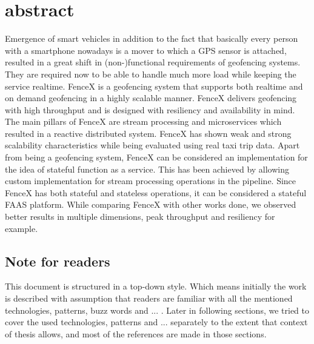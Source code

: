 \documentclass[a4]{report}
\begin{document}
        \section{abstract}
        Emergence of smart vehicles in addition to the fact that basically every person with a smartphone nowadays is a
        mover to which a GPS sensor is attached, resulted in a great shift in (non-)functional requirements of geofencing
        systems.
        They are required now to be able to handle much more load while keeping the service realtime.
        FenceX is a geofencing system that supports both realtime and on demand geofencing in a highly scalable manner.
        FenceX delivers geofencing with high throughput and is designed with resiliency and availability in mind.
        The main pillars of FenceX are stream processing and microservices which resulted in a reactive distributed
        system.
        FenceX has shown weak and strong scalability characteristics while being evaluated using real taxi trip data.
        Apart from being a geofencing system, FenceX can be considered an implementation for the idea of stateful function
        as a service.
        This has been achieved by allowing custom implementation for stream processing operations in the pipeline.
        Since FenceX has both stateful and stateless operations, it can be considered a stateful FAAS platform.
        While comparing FenceX with other works done, we observed better results in multiple dimensions, peak throughput
        and resiliency for example.

        \newpage

        \tableofcontents

        \listoffigures

        \newpage

        \subsection{Note for readers}
        This document is structured in a top-down style.
        Which means initially the work is described with assumption that readers are familiar with all the mentioned
        technologies, patterns, buzz words and ... .
        Later in following sections, we tried to cover the used technologies, patterns and ... separately to the extent
        that context of thesis allows, and most of the references are made in those sections.
\end{document}
